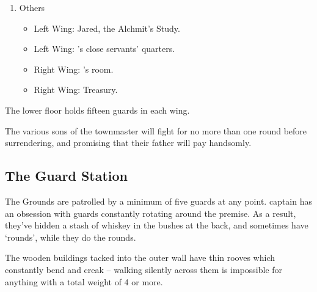 \begin{multicols}{2}
\begin{enumerate}
	\item{Others}
		\begin{itemize}
			\item{Left Wing: Jared, the Alchmit's Study.}
			\item{Left Wing: 's close servants' quarters.}
			\item{Right Wing: 's room.}
			\item{Right Wing: Treasury.}
		\end{itemize}

\end{enumerate}


The lower floor holds fifteen guards in each wing.

\humansoldier


The various sons of the townmaster will fight for no more than one round before surrendering, and promising that their father will pay handsomly.

\humandiplomat

\label{citadel_alchemist}

\humanalchemist

\subsection{The Guard Station}\label{guardstation}
The Grounds are patrolled by a minimum of five guards at any point.  \Gls{captain} has an obsession with guards constantly rotating around the premise.  As a result, they've hidden a stash of whiskey in the bushes at the back, and sometimes have `rounds', while they do the rounds.

The wooden buildings tacked into the outer wall have thin rooves which constantly bend and creak -- walking silently across them is impossible for anything with a total weight of 4 or more.

\noindent

\begin{enumerate}


\end{enumerate}
\end{multicols}
